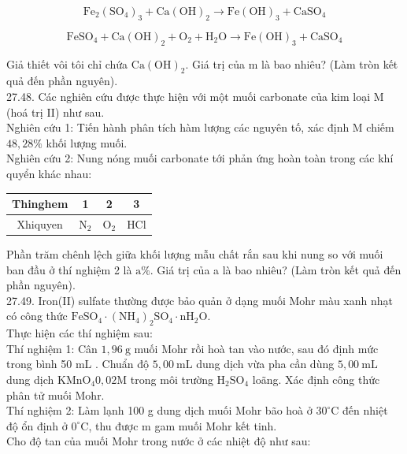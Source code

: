 \documentclass[10pt]{article}
\begin{document}
\begin{equation*}
\mathrm{Fe}_{2}\left(\mathrm{SO}_{4}\right)_{3}+\mathrm{Ca}(\mathrm{OH})_{2} \longrightarrow \mathrm{Fe}(\mathrm{OH})_{3}+\mathrm{CaSO}_{4} \tag{1}
\end{equation*}



\begin{equation*}
\mathrm{FeSO}_{4}+\mathrm{Ca}(\mathrm{OH})_{2}+\mathrm{O}_{2}+\mathrm{H}_{2} \mathrm{O} \longrightarrow \mathrm{Fe}(\mathrm{OH})_{3}+\mathrm{CaSO}_{4} \tag{2}
\end{equation*}


Giả thiết vôi tôi chỉ chứa $\mathrm{Ca}(\mathrm{OH})_{2}$. Giá trị của m là bao nhiêu? (Làm tròn kết quả đến phần nguyên).\\
27.48. Các nghiên cứu được thực hiện với một muối carbonate của kim loại M (hoá trị II) như sau.\\
Nghiên cứu 1: Tiến hành phân tích hàm lượng các nguyên tố, xác định M chiếm $48,28 \%$ khối lượng muối.\\
Nghiên cứu 2: Nung nóng muối carbonate tới phản ứng hoàn toàn trong các khí quyển khác nhau:

\begin{center}
\begin{tabular}{|c|c|c|c|}
\hline
Thinghem & 1 & 2 & 3 \\
\hline
Xhiquyen & $\mathrm{N}_{2}$ & $\mathrm{O}_{2}$ & HCl \\
\hline
\end{tabular}
\end{center}

Phần trăm chênh lệch giữa khối lượng mẫu chất rắn sau khi nung so với muối ban đầu ở thí nghiệm 2 là $\mathrm{a} \%$. Giá trị của a là bao nhiêu? (Làm tròn kết quả đến phần nguyên).\\
27.49. Iron(II) sulfate thường được bảo quản ở dạng muối Mohr màu xanh nhạt có công thức $\mathrm{FeSO}_{4} \cdot\left(\mathrm{NH}_{4}\right)_{2} \mathrm{SO}_{4} \cdot \mathrm{nH}_{2} \mathrm{O}$.\\
Thực hiện các thí nghiệm sau:\\
Thí nghiệm 1: Cân $1,96 \mathrm{~g}$ muối Mohr rồi hoà tan vào nước, sau đó định mức trong bình 50 mL . Chuẩn độ $5,00 \mathrm{~mL}$ dung dịch vừa pha cần dùng $5,00 \mathrm{~mL}$ dung dịch $\mathrm{KMnO}_{4} 0,02 \mathrm{M}$ trong môi trường $\mathrm{H}_{2} \mathrm{SO}_{4}$ loãng. Xác định công thức phân tử muối Mohr.\\
Thí nghiệm 2: Làm lạnh 100 g dung dịch muối Mohr bão hoà ở $30^{\circ} \mathrm{C}$ đến nhiệt độ ổn định ở $0^{\circ} \mathrm{C}$, thu được m gam muối Mohr kết tinh.\\
Cho độ tan của muối Mohr trong nước ở các nhiệt độ như sau:
\end{document}
